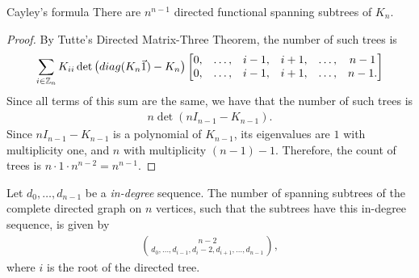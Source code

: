 \begin{cor}{Cayley's formula}\label{cor:cayley-formula}\proofbreak
    There are $n^{n-1}$ directed functional spanning subtrees of $K_{n}$.
\end{cor}

\begin{proof}
    By Tutte's Directed Matrix-Three Theorem, the number of such trees is
    \begin{align*}
        \sum_{i\in\mathbb{Z}_n}K_{ii}\det\left(diag(K_n\vec{1}) - K_n\right)\begin{bmatrix}
            0, &\ldots, &i-1, &i+1, &\ldots, &n-1 \\
            0, &\ldots, &i-1, &i+1, &\ldots, &n-1.
        \end{bmatrix}
    \end{align*}
    Since all terms of this sum are the same, we have that the number of such trees is
    \begin{align*}
        n\det(nI_{n-1}-K_{n-1}).
    \end{align*}
    Since $nI_{n-1} - K_{n-1}$ is a polynomial of $K_{n-1}$, its eigenvalues are $1$ with multiplicity one, and $n$ with multiplicity $(n-1)-1$. Therefore, the count of trees is $n\cdot 1 \cdot n^{n-2} = n^{n-1}$.
\end{proof}

\begin{cor}
    Let $d_0, \ldots, d_{n-1}$ be a \emph{in-degree} sequence. The number of spanning subtrees of the complete directed graph on $n$ vertices, such that the subtrees have this in-degree sequence, is given by
    \begin{align*}
        \binom{n-2}{d_0, \ldots, d_{i-1}, d_{i}-2, d_{i+1}, \ldots, d_{n-1}},
    \end{align*}
    where $i$ is the root of the directed tree.
\end{cor}

